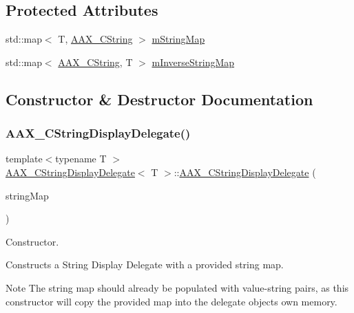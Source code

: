 \subsection*{Protected Attributes}
\begin{DoxyCompactItemize}
\item 
std\+::map$<$ T, \mbox{\hyperlink{a01573}{A\+A\+X\+\_\+\+C\+String}} $>$ \mbox{\hyperlink{a01581_aba142c61f06272adbaed051751d96123}{m\+String\+Map}}
\item 
std\+::map$<$ \mbox{\hyperlink{a01573}{A\+A\+X\+\_\+\+C\+String}}, T $>$ \mbox{\hyperlink{a01581_a388606665c60b57c16152b0424c54e2e}{m\+Inverse\+String\+Map}}
\end{DoxyCompactItemize}


\subsection{Constructor \& Destructor Documentation}
\mbox{\label{a01581_a675d5d95e04e023b0650c621ddaf4972}} 
\subsubsection{\texorpdfstring{AAX\_CStringDisplayDelegate()}{AAX\_CStringDisplayDelegate()}}
{\footnotesize\ttfamily template$<$typename T $>$ \\
\mbox{\hyperlink{a01581}{A\+A\+X\+\_\+\+C\+String\+Display\+Delegate}}$<$ T $>$\+::\mbox{\hyperlink{a01581}{A\+A\+X\+\_\+\+C\+String\+Display\+Delegate}} (\begin{DoxyParamCaption}\item[{const std\+::map$<$ T, \mbox{\hyperlink{a01573}{A\+A\+X\+\_\+\+C\+String}} $>$ \&}]{string\+Map }\end{DoxyParamCaption})}



Constructor. 

Constructs a String Display Delegate with a provided string map.

\begin{DoxyNote}{Note}
The string map should already be populated with value-\/string pairs, as this constructor will copy the provided map into the delegate object\textquotesingle{}s own memory.
\end{DoxyNote}

